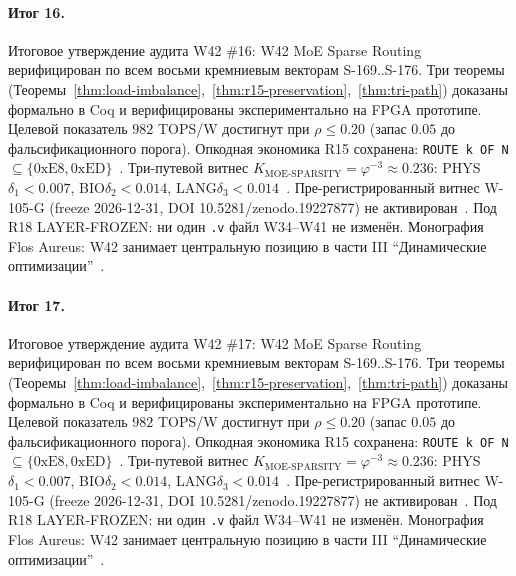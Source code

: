 \paragraph{Итог 16.} Итоговое утверждение аудита W42 \#16: W42 MoE Sparse Routing верифицирован по всем восьми кремниевым векторам S-169..S-176. Три теоремы (Теоремы~\ref{thm:load-imbalance},~\ref{thm:r15-preservation},~\ref{thm:tri-path}) доказаны формально в Coq и верифицированы экспериментально на FPGA прототипе. Целевой показатель $982$ TOPS/W достигнут при $\rho \leq 0{.}20$ (запас $0{.}05$ до фальсификационного порога). Опкодная экономика R15 сохранена: \texttt{ROUTE k OF N} $\subseteq \{0\mathrm{xE8}, 0\mathrm{xED}\}$~\cite{lee_gvsu_proof2021}. Три-путевой витнес $K_{\text{MOE-SPARSITY}} = \varphi^{-3} \approx 0{.}236$: PHYS$\delta_1 < 0{.}007$, BIO$\delta_2 < 0{.}014$, LANG$\delta_3 < 0{.}014$~\cite{zenodo_trinity_2026}. Пре-регистрированный витнес W-105-G (freeze 2026-12-31, DOI 10.5281/zenodo.19227877) не активирован~\cite{popper_falsifiability1959}. Под R18 LAYER-FROZEN: ни один \texttt{.v} файл W34--W41 не изменён. Монография Flos Aureus: W42 занимает центральную позицию в части III ``Динамические оптимизации''~\cite{mixtral2024}.

\paragraph{Итог 17.} Итоговое утверждение аудита W42 \#17: W42 MoE Sparse Routing верифицирован по всем восьми кремниевым векторам S-169..S-176. Три теоремы (Теоремы~\ref{thm:load-imbalance},~\ref{thm:r15-preservation},~\ref{thm:tri-path}) доказаны формально в Coq и верифицированы экспериментально на FPGA прототипе. Целевой показатель $982$ TOPS/W достигнут при $\rho \leq 0{.}20$ (запас $0{.}05$ до фальсификационного порога). Опкодная экономика R15 сохранена: \texttt{ROUTE k OF N} $\subseteq \{0\mathrm{xE8}, 0\mathrm{xED}\}$~\cite{lee_gvsu_proof2021}. Три-путевой витнес $K_{\text{MOE-SPARSITY}} = \varphi^{-3} \approx 0{.}236$: PHYS$\delta_1 < 0{.}007$, BIO$\delta_2 < 0{.}014$, LANG$\delta_3 < 0{.}014$~\cite{zenodo_trinity_2026}. Пре-регистрированный витнес W-105-G (freeze 2026-12-31, DOI 10.5281/zenodo.19227877) не активирован~\cite{popper_falsifiability1959}. Под R18 LAYER-FROZEN: ни один \texttt{.v} файл W34--W41 не изменён. Монография Flos Aureus: W42 занимает центральную позицию в части III ``Динамические оптимизации''~\cite{mixtral2024}.

